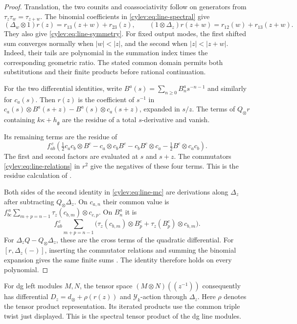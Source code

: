 \begin{proof}
Translation, the two counits and coassociativity follow on generators
from $\tau_z\tau_w=\tau_{z+w}$.
The binomial coefficients in \eqref{cylev:eq:line-spectral} give
\[
 (\Delta_w\otimes1)r(z)=r_{13}(z+w)+r_{23}(z),\qquad
 (1\otimes\Delta_z)r(z+w)=r_{12}(w)+r_{13}(z+w).
\]
They also give \eqref{cylev:eq:line-symmetry}.
For fixed output modes, the first shifted sum converges normally
when $|w|<|z|$, and the second when $|z|<|z+w|$.
Indeed, their tails are polynomial in the summation index times
the corresponding geometric ratio.
The stated common domain permits both substitutions and their
finite products before rational continuation.

For the two differential identities, write
$B^a(s)=\sum_{n\ge0}B^a_ns^{-n-1}$ and similarly for $c_a(s)$.
Then $r(z)$ is the coefficient of $s^{-1}$ in
$c_a(s)\otimes B^a(s+z)-B^a(s)\otimes c_a(s+z)$, expanded in $s/z$.
The terms of $Q_\otimes r$ containing $k\kappa+h_{\mathfrak g}$
are the residue of a total $s$-derivative and vanish.

Its remaining terms are the residue of
\[
 f_{ab}^{\ c}\left(
 \tfrac12c_ac_b\otimes B^c-c_a\otimes c_bB^c
          -c_bB^c\otimes c_a-\tfrac12B^c\otimes c_ac_b\right).
\]
The first and second factors are evaluated at $s$ and $s+z$.
The commutators \eqref{cylev:eq:line-relations} in $r^2$ give the
negatives of these four terms. This is the residue calculation
of \cite[(7.23)--(7.24)]{DimofteNiuPy2025}.

Both sides of the second identity in \eqref{cylev:eq:line-mc} are
derivations along $\Delta_z$ after subtracting $Q_\otimes\Delta_z$.
On $c_{a,n}$ their common value is
$f_{bc}^{\ a}\sum_{m+p=n-1}\tau_z(c_{b,m})\otimes c_{c,p}$.
On $B^a_n$ it is
\[
 f_{ab}^{\ c}\sum_{m+p=n-1}
       \bigl(\tau_z(c_{b,m})\otimes B^c_p+
                    \tau_z(B^c_p)\otimes c_{b,m}\bigr).
\]
For $\Delta_zQ-Q_\otimes\Delta_z$, these are the cross terms of
the quadratic differential.
For $[r,\Delta_z(-)]$, inserting the commutator relations and summing
the binomial expansion gives the same finite sums
\cite[\S7.2.3]{DimofteNiuPy2025}.
The identity therefore holds on every polynomial.
\end{proof}

For dg left modules $M,N$, the tensor space
$(M\otimes N)((z^{-1}))$ consequently has differential
$D_z=d_\otimes+\rho(r(z))$ and $\mathcal Y_k$-action through $\Delta_z$.
Here $\rho$ denotes the tensor product representation.
Its iterated products use the common triple twist just displayed.
This is the spectral tensor product of the dg line modules.

